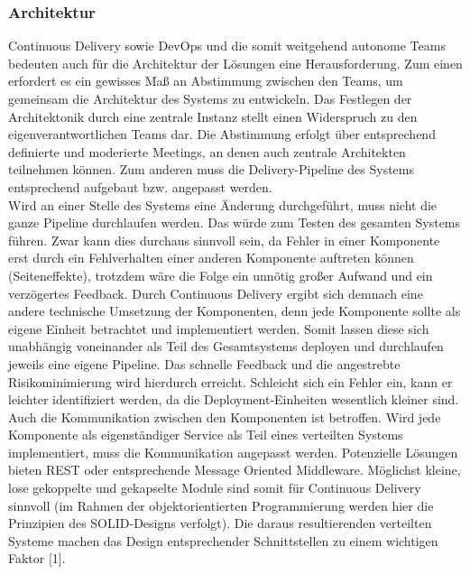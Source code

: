 \subsubsection{Architektur}
Continuous Delivery sowie DevOps und die somit weitgehend autonome Teams bedeuten auch für die Architektur der Lösungen eine Herausforderung. Zum einen erfordert es ein gewisses Maß an Abstimmung zwischen den Teams, um gemeinsam die Architektur des Systems zu entwickeln. Das Festlegen der Architektonik durch eine zentrale Instanz stellt einen Widerspruch zu den eigenverantwortlichen Teams dar. Die Abstimmung erfolgt über entsprechend definierte und moderierte Meetings, an denen auch zentrale Architekten teilnehmen können. Zum anderen muss die Delivery-Pipeline des Systems entsprechend aufgebaut bzw. angepasst werden.\\ Wird an einer Stelle des Systems eine Änderung durchgeführt, muss nicht die ganze Pipeline durchlaufen werden. Das würde zum Testen des gesamten Systems führen. Zwar kann dies durchaus sinnvoll sein, da Fehler in einer Komponente erst durch ein Fehlverhalten einer anderen Komponente auftreten können (Seiteneffekte), trotzdem wäre die Folge ein unnötig großer Aufwand und ein verzögertes Feedback. Durch Continuous Delivery ergibt sich demnach eine andere technische Umsetzung der Komponenten, denn jede Komponente sollte als eigene Einheit betrachtet und implementiert werden. Somit lassen diese sich unabhängig voneinander als Teil des Gesamtsystems deployen und durchlaufen jeweils eine eigene Pipeline. Das schnelle Feedback und die angestrebte Risikominimierung wird hierdurch erreicht. Schleicht sich ein Fehler ein, kann er leichter identifiziert werden, da die Deployment-Einheiten wesentlich kleiner sind. Auch die Kommunikation zwischen den Komponenten ist betroffen. Wird jede Komponente als eigenständiger Service als Teil eines verteilten Systems implementiert, muss die Kommunikation angepasst werden. Potenzielle Lösungen bieten REST oder entsprechende Message Oriented Middleware. Möglichst kleine, lose gekoppelte und gekapselte Module sind somit für Continuous Delivery sinnvoll (im Rahmen der objektorientierten Programmierung werden hier die Prinzipien des SOLID-Designs verfolgt). Die daraus resultierenden verteilten Systeme machen das Design entsprechender Schnittstellen zu einem wichtigen Faktor [1]. \\ \\
